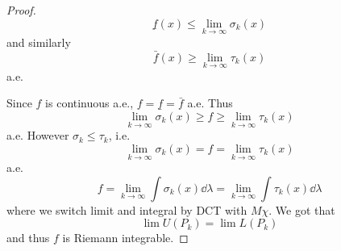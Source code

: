 \begin{theorem}
\begin{proof}
	$$\underline{f}(x) \leq \lim_{k\to \infty} \sigma_k(x)$$
	and similarly 
	$$\bar{f}(x) \geq \lim_{k\to \infty} \tau_k(x)$$
	a.e.
	
	Since $f$ is continuous a.e., $f=\underline{f}=\bar{f}$ a.e. Thus
	$$ \lim_{k\to \infty} \sigma_k(x) \geq f \geq \lim_{k\to \infty} \tau_k(x)$$
	a.e. However $\sigma_k \leq \tau_k$, i.e.
	$$ \lim_{k\to \infty} \sigma_k(x) = f = \lim_{k\to \infty} \tau_k(x)$$
	a.e.
	$$ f = \lim_{k\to \infty} \int \sigma_k(x) \dd{\lambda} = \lim_{k\to \infty} \int  \tau_k(x) \dd{\lambda}$$
	where we switch limit and integral by DCT with $M\chi$.
	We got that
	$$\lim U(P_k) = \lim L(P_k) $$
	and thus $f$ is Riemann integrable.
\end{proof}
\end{theorem}